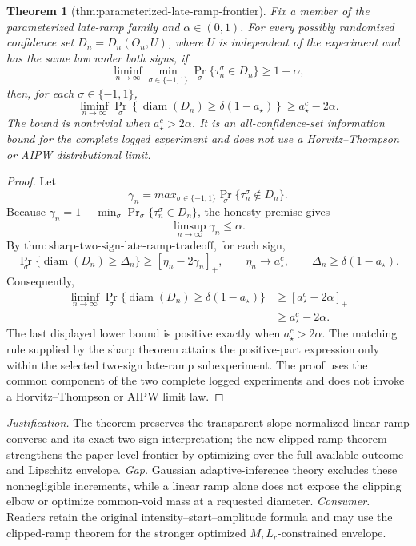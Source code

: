 \documentclass{article}
\newtheorem{theorem}{Theorem}
\begin{document}
\begin{theorem}[thm:parameterized-late-ramp-frontier]\label{thm:parameterized-late-ramp-frontier}
Fix a member of the parameterized late-ramp family and \(\alpha\in(0,1)\). For every possibly randomized confidence set \(D_n=D_n(O_n,U)\), where \(U\) is independent of the experiment and has the same law under both signs, if
\[
 \liminf_{n\to\infty}\min_{\sigma\in\{-1,1\}}
 \Pr_\sigma\{\tau_n^\sigma\in D_n\}\ge1-\alpha,
\]
then, for each \(\sigma\in\{-1,1\}\),
\[
 \liminf_{n\to\infty}\Pr_\sigma\!\left\{
 \operatorname{diam}(D_n)\ge\delta(1-a_\star)\right\}
 \ge a_\star^c-2\alpha.
\]
The bound is nontrivial when \(a_\star^c>2\alpha\). It is an all-confidence-set information bound for the complete logged experiment and does not use a Horvitz--Thompson or AIPW distributional limit.
\end{theorem}
\begin{proof}
Let
\[
 \gamma_n=max_{\sigma\in\{-1,1\}}
 \Pr_\sigma\{\tau_n^\sigma\notin D_n\}.
\]
Because \(\gamma_n=1-\min_\sigma\Pr_\sigma\{\tau_n^\sigma\in D_n\}\), the honesty premise gives
\[
 \limsup_{n\to\infty}\gamma_n\le\alpha.
\]
By \(\mathrm{thm:sharp\mbox{-}two\mbox{-}sign\mbox{-}late\mbox{-}ramp\mbox{-}tradeoff}\), for each sign,
\[
 \Pr_\sigma\{\operatorname{diam}(D_n)\ge\Delta_n\}
 \ge[\eta_n-2\gamma_n]_+,
 \qquad
 \eta_n\to a_\star^c,
 \qquad
 \Delta_n\ge\delta(1-a_\star).
\]
Consequently,
\[
 \begin{aligned}
 \liminf_{n\to\infty}
 \Pr_\sigma\{\operatorname{diam}(D_n)
                 \ge\delta(1-a_\star)\}
 &\ge[a_\star^c-2\alpha]_+\\
 &\ge a_\star^c-2\alpha.
 \end{aligned}
\]
The last displayed lower bound is positive exactly when \(a_\star^c>2\alpha\). The matching rule supplied by the sharp theorem attains the positive-part expression only within the selected two-sign late-ramp subexperiment. The proof uses the common component of the two complete logged experiments and does not invoke a Horvitz--Thompson or AIPW limit law.
\end{proof}
\par\smallskip\noindent \textit{Justification.} The theorem preserves the transparent slope-normalized linear-ramp converse and its exact two-sign interpretation; the new clipped-ramp theorem strengthens the paper-level frontier by optimizing over the full available outcome and Lipschitz envelope. \textit{Gap.} Gaussian adaptive-inference theory excludes these nonnegligible increments, while a linear ramp alone does not expose the clipping elbow or optimize common-void mass at a requested diameter. \textit{Consumer.} Readers retain the original intensity--start--amplitude formula and may use the clipped-ramp theorem for the stronger optimized \(M,L_r\)-constrained envelope.
\end{document}
